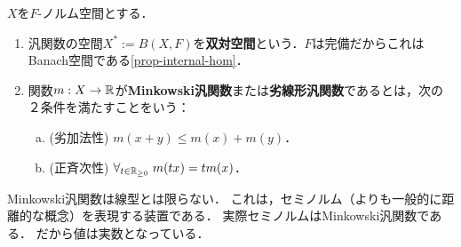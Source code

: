 \documentclass[uplatex,dvipdfmx]{jsreport}
\begin{document}
\begin{definition}
    $X$を$F$-ノルム空間とする．
    \begin{enumerate}
        \item 汎関数の空間$X^*:=B(X,F)$を\textbf{双対空間}という．$F$は完備だからこれはBanach空間である\ref{prop-internal-hom}．
        \item 関数$m:X\to\mathbb{R}$が\textbf{Minkowski汎関数}または\textbf{劣線形汎関数}であるとは，次の２条件を満たすことをいう：
        \begin{enumerate}[(a)]
            \item (劣加法性) $m(x+y)\le m(x)+m(y)$．
            \item (正斉次性) $\forall_{t\in\mathbb{R}_{\ge 0}}\;m(tx)=tm(x)$．
        \end{enumerate}
    \end{enumerate}
\end{definition}
\begin{remarks}
    Minkowski汎関数は線型とは限らない．
    これは，セミノルム（よりも一般的に距離的な概念）を表現する装置である．
    実際セミノルムはMinkowski汎関数である．
    だから値は実数となっている．
\end{remarks}
\end{document}
